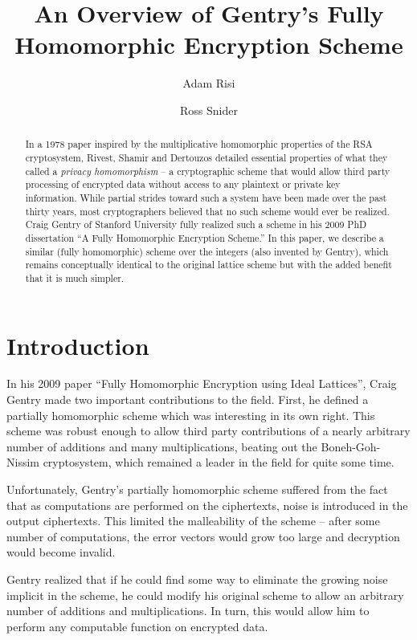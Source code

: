 \documentclass[a4paper,10pt]{article}
\title{An Overview of Gentry's Fully Homomorphic Encryption Scheme}
\author{Adam Risi \and Ross Snider}
\begin{document}
\maketitle
\titlepage
\tableofcontents
\pagebreak

\begin{abstract}
  In a 1978 paper\cite{rad-priv} inspired by the multiplicative
  homomorphic properties of the RSA cryptosystem, Rivest, Shamir and
  Dertouzos detailed essential properties of what they called a
  \textit{privacy homomorphism} -- a cryptographic scheme that would
  allow third party processing of encrypted data without access to any
  plaintext or private key information. While partial strides toward
  such a system have been made over the past thirty years, most
  cryptographers believed that no such scheme would ever be
  realized. Craig Gentry of Stanford University fully realized such a
  scheme in his 2009 PhD dissertation ``A Fully Homomorphic Encryption
  Scheme.''\cite{gentry-thesis} In this paper, we describe a similar
  (fully homomorphic) scheme over the integers (also invented by
  Gentry)\cite{gentry-integer}, which remains conceptually identical
  to the original lattice scheme but with the added benefit that it is
  much simpler.
\end{abstract}

\section{Introduction}
In his 2009 paper ``Fully Homomorphic Encryption using Ideal
Lattices''\cite{gentry-lattice}, Craig Gentry made two important
contributions to the field. First, he defined a partially homomorphic
scheme which was interesting in its own right. This scheme was robust
enough to allow third party contributions of a nearly arbitrary number
of additions and many multiplications, beating out the
Boneh-Goh-Nissim cryptosystem, which remained a leader in the field
for quite some time.

Unfortunately, Gentry's partially homomorphic scheme suffered from the
fact that as computations are performed on the ciphertexts, noise is
introduced in the output ciphertexts. This limited the malleability of
the scheme -- after some number of computations, the error vectors
would grow too large and decryption would become invalid.

Gentry realized that if he could find some way to eliminate the
growing noise implicit in the scheme, he could modify his original
scheme to allow an arbitrary number of additions and
multiplications. In turn, this would allow him to perform any
computable function on encrypted data.
\end{document}
